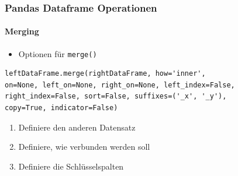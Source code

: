 \documentclass[12pt,ngerman]{beamer}
\begin{document}
\begin{frame}[fragile]
\frametitle{Pandas Dataframe Operationen}
\framesubtitle{Merging}

\begin{itemize}
	\item Optionen für \texttt{merge()}
\end{itemize}

\begin{lstlisting}
leftDataFrame.merge(rightDataFrame, how='inner', 
on=None, left_on=None, right_on=None, left_index=False, 
right_index=False, sort=False, suffixes=('_x', '_y'), 
copy=True, indicator=False)
\end{lstlisting}

\begin{enumerate}
\item Definiere den anderen Datensatz
\item Definiere, wie verbunden werden soll
\item Definiere die Schlüsselspalten
\end{enumerate}

\end{frame}
\end{document}
